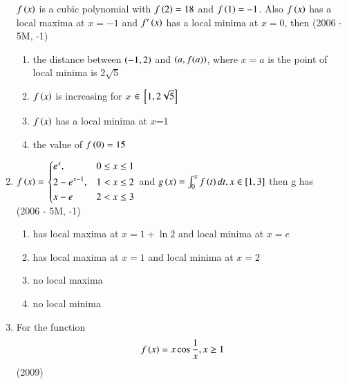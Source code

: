 \documentclass[journal]{IEEEtran}
\begin{document}
\begin{enumerate}
{            $f\left(x\right)$ is a cubic polynomial with  $f\left(2\right)=18$ and $f\left(1\right)=-1$. Also $f\left(x\right)$ has a local maxima at $x=-1$ and $f'\left(x\right)$ has a local minima at $x=0$, then
              \hfill
                {(2006 - 5M, -1)}
            
            \begin{enumerate}
                \item the distance between $\left(-1,2\right)$ and $\left(a,f(a)\right)$, where $x=a$ is the point of local minima is $2\sqrt{5}$
                \item $f\left(x\right)$ is increasing for $x$ $\in {}\left[1,2\sqrt{5}\right]$
                \item $f\left(x\right)$ has a local minima at $x$=1
                \item the value of $f\left(0\right)=15$
            \end{enumerate}
        
        }
    \item{
        
            $f\left(x\right) = $    
            $\begin{dcases}%
                e^x, & 0 \leq x\leq 1 \\
                2-e^{x-1}, & 1 < x\leq 2 \\
                x-e & 2 < x\leq 3 \\
            \end{dcases}$ and $g\left(x\right) = \int_0^{x}f\left(t\right)dt, x \in[1,3]$ then g has
             \\ \text{   } \hfill
                {(2006 - 5M, -1)}
            
            \begin{enumerate}
                \item has local maxima at $x = 1+ \ln{2}$ and local minima at $x = e$
                \item has local maxima at $x = 1$ and local minima at $x = 2$
                \item no local maxima
                \item no local minima
            \end{enumerate}
        
        }
    \item{
        
            For the function $$f\left(x\right) = x\cos{\frac{1}{x}}, x\geq1$$
             \hfill
                {(2009)}
            
}
\end{enumerate}
\end{document}
